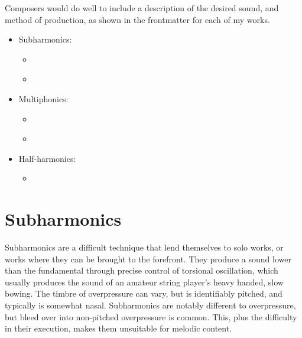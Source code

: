 Composers would do well to include a description of the desired sound, and method of production, as shown in the frontmatter for each of my works. \begin{itemize}
  \item Subharmonics: \begin{itemize} 
    \item \hyperref[app:violaPiece Score]{\violaPiece} 
    \item \hyperref[app:bassPiece Score]{\bassPiece} \end{itemize}
  \item Multiphonics: \begin{itemize} 
    \item \hyperref[app:bassPiece Score]{\bassPiece} 
    \item \hyperref[app:celloPiece Score]{\celloPiece}\end{itemize}
  \item Half-harmonics: \begin{itemize} 
    \item \hyperref[app:violinPiece Score]{\violinPiece}\end{itemize}
\end{itemize}


\section{Subharmonics}\label{sec:subharmonics}
Subharmonics are a difficult technique that lend themselves to solo works, or works where they can be brought to the forefront.
They produce a sound lower than the fundamental through precise control of torsional oscillation, which usually produces the sound of an amateur string player's heavy handed, slow bowing. 
The timbre of overpressure can vary, but is identifiably pitched, and typically is somewhat nasal.
Subharmonics are notably different to overpressure, but bleed over into non-pitched overpressure is common.
This, plus the difficulty in their execution, makes them unsuitable for melodic content.

